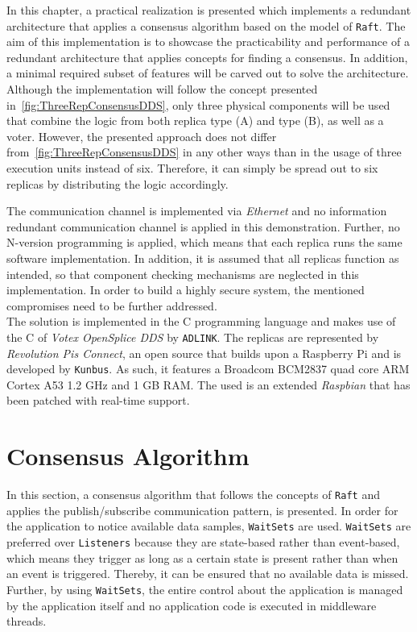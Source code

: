 In this chapter, a practical realization is presented which implements a redundant architecture that applies a consensus algorithm based on the model of \texttt{Raft}.
The aim of this implementation is to showcase the practicability and performance of a redundant architecture that applies  concepts for finding a consensus.
In addition, a minimal required subset of  features will be carved out to solve the architecture.
Although the implementation will follow the concept presented in~\autoref{fig:ThreeRepConsensusDDS}, only three physical components will be used that combine the logic from both replica type (A) and type (B), as well as a voter.
However, the presented approach does not differ from~\autoref{fig:ThreeRepConsensusDDS} in any other ways than in the usage of three execution units instead of six.
Therefore, it can simply be spread out to six replicas by distributing the logic accordingly.

The communication channel is implemented via \textit{Ethernet} and no information redundant communication channel is applied in this demonstration.
Further, no N-version programming is applied, which means that each replica runs the same software implementation.
In addition, it is assumed that all replicas function as intended, so that component checking mechanisms are neglected in this implementation.
In order to build a highly secure system, the mentioned compromises need to be further addressed.
\\

The solution is implemented in the C programming language and makes use of the C  of \textit{Votex OpenSplice DDS} by \texttt{ADLINK}.
The replicas are represented by \textit{Revolution Pis Connect}, an open source  that builds upon a Raspberry Pi and is developed by \texttt{Kunbus}.
As such, it features a Broadcom BCM2837 quad core ARM Cortex A53 1.2 GHz  and 1 GB RAM.
The used  is an extended \textit{Raspbian}  that has been patched with real-time support.


\section{Consensus Algorithm}

In this section, a consensus algorithm that follows the concepts of \texttt{Raft} and applies the  publish/subscribe communication pattern, is presented.
In order for the application to notice available data samples, \texttt{WaitSets} are used.
\texttt{WaitSets} are preferred over \texttt{Listeners} because they are state-based rather than event-based, which means they trigger as long as a certain state is present rather than when an event is triggered.
Thereby, it can be ensured that no available data is missed.
Further, by using \texttt{WaitSets}, the entire control about the application is managed by the application itself and no application code is executed in middleware threads.
\\

